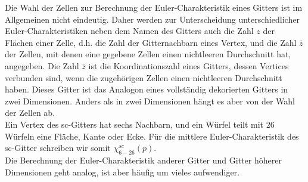Die Wahl der Zellen zur Berechnung der Euler-Charakteristik eines Gitters ist im Allgemeinen nicht eindeutig. Daher werden zur Unterscheidung unterschiedlicher Euler-Charakteristiken neben dem Namen des Gitters auch die Zahl $z$ der Fl\"achen einer Zelle, d.h. die Zahl der Gitternachbarn eines Vertex, und die Zahl $\bar{z}$ der Zellen, mit denen eine gegebene Zellen einen nichtleeren Durchschnitt hat, angegeben. Die Zahl $\bar{z}$ ist die Koordinationszahl eines Gitters, dessen Vertices verbunden sind, wenn die zugeh\"origen Zellen einen nichtleeren Durchschnitt haben. Dieses Gitter ist das Analogon eines vollst\"andig dekorierten Gitters in zwei Dimensionen. Anders als in zwei Dimensionen h\"angt es aber von der Wahl der Zellen ab. 
\\Ein Vertex des sc-Gitters hat sechs Nachbarn, und ein W\"urfel teilt mit 26 W\"urfeln eine Fl\"ache, Kante oder Ecke. F\"ur die mittlere Euler-Charakteristik des sc-Gitter schreiben wir somit $\chi^{sc}_{6-26}(p)$.
\\Die Berechnung der Euler-Charakteristik anderer Gitter und Gitter h\"oherer Dimensionen geht analog, ist aber h\"aufig um vieles aufwendiger.


